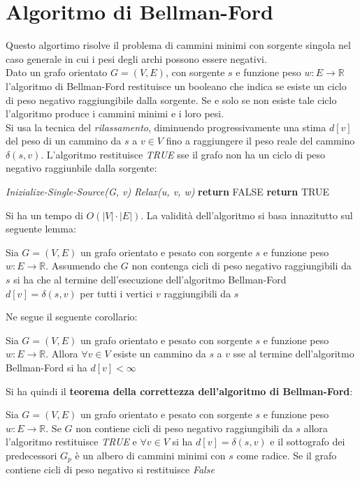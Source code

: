 \documentclass[a4paper,12pt, oneside]{book}
\begin{document}
\section{Algoritmo di Bellman-Ford}
Questo algortimo risolve il problema di cammini minimi con sorgente
singola nel caso generale in cui i pesi degli archi possono essere
negativi.\\ Dato un grafo orientato $G=(V,E)$, con sorgente $s$ e
funzione peso $w:E\to\mathbb{R}$ l'algoritmo di Bellman-Ford
restituisce un booleano che indica se esiste un ciclo di peso negativo
raggiungibile dalla sorgente. Se e solo se non esiste tale ciclo
l'algoritmo produce i cammini minimi e i loro pesi.\\
Si usa la tecnica del \textit{rilassamento}, diminuendo
progressivamente una stima $d[v]$ del peso di un cammino da $s$ a
$v\in V$ fino a raggiungere il peso reale del cammino
$\delta(s,v)$. L'algoritmo restituisce \textit{TRUE} sse il grafo non
ha un ciclo di peso negativo raggiunbile dalla sorgente:
\begin{algorithm}[H]
  \begin{algorithmic}
    \State \textit{Inizialize-Single-Source(G, v)}
    \State \textit{Relax(u, v, w)}
    \EndFor
    \EndFor
    \State \textbf{return} FALSE
    \EndIf
    \EndFor
    \State \textbf{return} TRUE
    \EndFunction
  \end{algorithmic}
\end{algorithm}
Si ha un tempo di $O(|V|\cdot |E|)$. La validità dell'algoritmo si
basa innazitutto sul seguente lemma:
\begin{lemma}
  Sia $G=(V,E)$ un grafo orientato e pesato con sorgente $s$ e
  funzione peso $w:E\to \mathbb{R}$. Assumendo che $G$ non contenga
  cicli di peso negativo raggiungibili da $s$ si ha che al termine
  dell'esecuzione dell'algoritmo Bellman-Ford $d[v]=\delta(s,v)$ per
  tutti i vertici $v$ raggiungibili da $s$
\end{lemma}
Ne segue il seguente corollario:
\begin{corollario}
  Sia $G=(V,E)$ un grafo orientato e pesato con sorgente $s$ e
  funzione peso $w:E\to \mathbb{R}$. Allora $\forall v\in V$ esiste un
  cammino da $s$ a $v$ sse al termine dell'algoritmo Bellman-Ford si
  ha $d[v]<\infty$ 
\end{corollario}
Si ha quindi il \textbf{teorema della correttezza dell'algoritmo di
  Bellman-Ford}:
\begin{teorema}
  Sia $G=(V,E)$ un grafo orientato e pesato con sorgente $s$ e
  funzione peso $w:E\to \mathbb{R}$. Se $G$ non contiene cicli di peso
  negativo raggiungibili da $s$ allora l'algoritmo restituisce
  \textit{TRUE} e $\forall v\in V$ si ha $d[v]=\delta(s,v)$ e il
  sottografo dei predecessori $G_p$ è un albero di cammini minimi
  con $s$ come radice. Se il grafo contiene cicli di peso negativo si
  restituisce \textit{False} 
\end{teorema}
\end{document}
